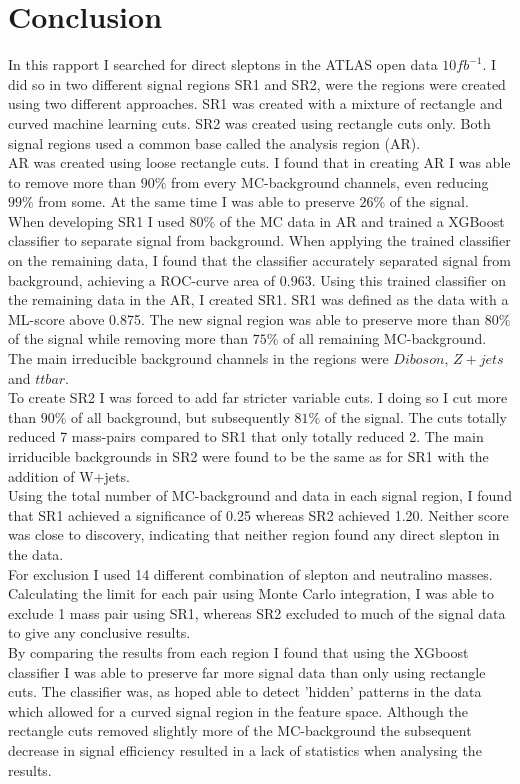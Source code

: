\documentclass{article}
\begin{document}
\section{Conclusion}
In this rapport I searched for direct sleptons in the ATLAS open data $10fb^{-1}$. I did so in two different signal regions SR1 and SR2, were the regions were created using two different approaches. SR1 was created with a mixture of rectangle and curved machine learning cuts. SR2 was created using rectangle cuts only. Both signal regions used a common base called the analysis region (AR).
\\
AR was created using loose rectangle cuts. I found that in creating AR I was able to remove more than $90\%$ from every MC-background channels, even reducing $99\%$ from some. At the same time I was able to preserve $26\%$ of the signal. 
\\
When developing SR1 I used $80\%$ of the MC data in AR and trained a XGBoost classifier to separate signal from background. When applying the trained classifier on the remaining data, I found that the classifier accurately separated signal from background, achieving a ROC-curve area of $0.963$. Using this trained classifier on the remaining data in the AR, I created SR1. SR1 was defined as the data with a ML-score above 0.875. The new signal region was able to preserve more than $80\%$ of the signal while removing more than $75\%$ of all remaining MC-background. The main irreducible background channels in the regions were $Diboson$, $Z+jets$ and $ttbar$.
\\
To create SR2 I was forced to add far stricter variable cuts. I doing so I cut more than $90\%$ of all background, but subsequently $81\%$ of the signal. The cuts totally reduced 7 mass-pairs compared to SR1 that only totally reduced 2. The main irriducible backgrounds in SR2 were found to be the same as for SR1 with the addition of W+jets.  
\\
Using the total number of MC-background and data in each signal region, I found that SR1 achieved a significance of 0.25 whereas SR2 achieved 1.20. Neither score was close to discovery, indicating that neither region found any direct slepton in the data. 
\\
For exclusion I used 14 different combination of slepton and neutralino masses. Calculating the limit for each pair using Monte Carlo integration, I was able to exclude 1 mass pair using SR1, whereas SR2 excluded to much of the signal data to give any conclusive results.
\\
By comparing the results from each region I found that using the XGboost classifier I was able to preserve far more signal data than only using rectangle cuts. The classifier was, as hoped able to detect 'hidden' patterns in the data which allowed for a curved signal region in the feature space. Although the rectangle cuts removed slightly more of the MC-background the subsequent decrease in signal efficiency resulted in a lack of statistics when analysing the results. 
\newpage
\printbibliography
\end{document}
